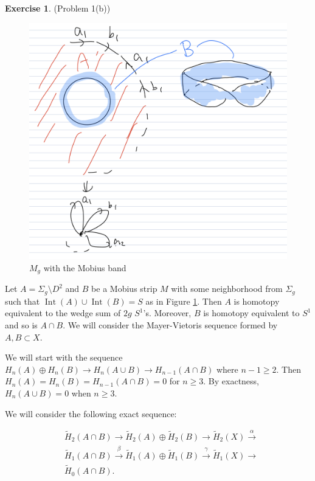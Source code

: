 \documentclass[12pt, psamsfonts]{amsart}
\theoremstyle{definition}
\newtheorem*{exer}{Exercise}
\theoremstyle{remark}
\DeclareMathOperator{\Int}{Int}
\numberwithin{equation}{section}
\begin{document}
\begin{exer}{(Problem 1(b))}
  \begin{figure}[!htb]
    \includegraphics[width=.7\linewidth]{Mg.jpeg}
    \caption{$M_g$ with the Mobius band}
    \label{fig:mg}
  \end{figure}
  Let $A = \Sigma_g \setminus D^2$ and $B$ be a Mobius strip $M$ with some neighborhood from $\Sigma_g$ such that $\Int(A) \cup \Int(B) = S$ as in Figure \ref{fig:mg}.
  Then $A$ is homotopy equivalent to the wedge sum of $2g$ $S^1$'s.
  Moreover, $B$ is homotopy equivalent to $S^1$ and so is $A \cap B$.
  We will consider the Mayer-Vietoris sequence formed by $A, B \subset X$.

  We will start with the sequence $H_n(A) \oplus H_n(B) \rightarrow H_n(A \cup B) \rightarrow H_{n - 1}(A \cap B)$ where $n - 1 \geq 2$.
  Then $H_n(A) = H_n(B) = H_{n - 1}(A \cap B) = 0$ for $n \geq 3$.
  By exactness, $H_n(A \cup B) = 0$ when $n \geq 3$.

  We will consider the following exact sequence:

  \begin{align*}
    &\tilde{H}_2(A \cap B) \rightarrow \tilde{H}_2(A) \oplus \tilde{H}_2(B) \rightarrow \tilde{H}_2(X) \xrightarrow{\alpha} \\
    &\tilde{H}_1(A \cap B) \xrightarrow{\beta} \tilde{H}_1(A) \oplus \tilde{H}_1(B) \xrightarrow{\gamma} \tilde{H}_1(X) \rightarrow \\
    &\tilde{H}_0(A \cap B).
  \end{align*}


\end{exer}
\end{document}
